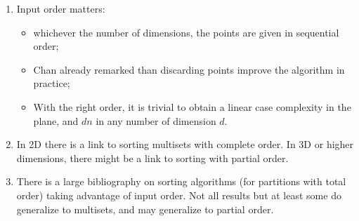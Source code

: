 \begin{enumerate}
\item Input order matters:
  \begin{itemize}
  \item whichever the number of dimensions, the points are given in
    sequential order;

  \item Chan already remarked than discarding points improve the
    algorithm in practice;

  \item With the right order, it is trivial to obtain a linear case
    complexity in the plane, and $dn$ in any number of dimension $d$.

  \end{itemize}

\item In 2D there is a link to sorting multisets with complete order.
In 3D or higher dimensions, there might be a link to sorting with partial order.


\item There is a large bibliography on sorting algorithms (for
  partitions with total order) taking advantage of input order. Not
  all results but at least some do generalize to multisets, and may
  generalize to partial order.

\end{enumerate}


